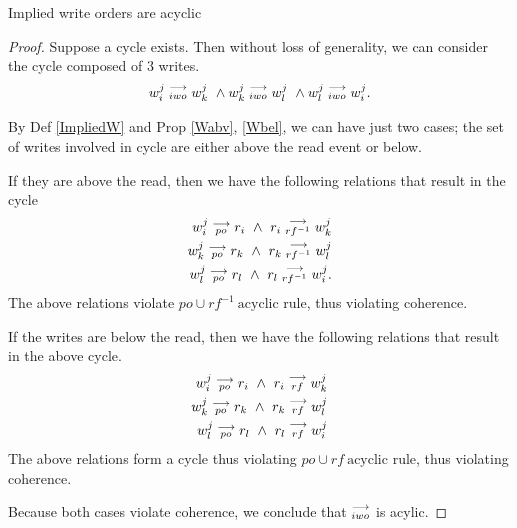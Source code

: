         
    \begin{property}
        \label{prop6}
        Implied write orders are acyclic
    \end{property}

    \begin{proof}
        Suppose a cycle exists. Then without loss of generality, we can consider the cycle composed of 3 writes.
        \begin{align*}
            \reln{w_i^j}{iwo}{w_k^j} \ \wedge \reln{w_k^j}{iwo}{w_l^j} \ \wedge \reln{w_l^j}{iwo}{w_i^j}.  
        \end{align*}
        
        By Def \ref{ImpliedW} and Prop \ref{Wabv}, \ref{Wbel}, we can have just two cases; the set of writes involved in cycle are either above the read event or below.

        If they are above the read, then we have the following relations that result in the cycle
        \begin{align*}
            w_i^j\stackrel{\longrightarrow}{_{po}}r_i \ \wedge \ r_i\stackrel{\longrightarrow}{_{rf^{-1}}}w_k^j \\
            w_k^j\stackrel{\longrightarrow}{_{po}}r_k \ \wedge \ r_k\stackrel{\longrightarrow}{_{rf^{-1}}}w_l^j \\
            w_l^j\stackrel{\longrightarrow}{_{po}}r_l \ \wedge \ r_l\stackrel{\longrightarrow}{_{rf^{-1}}}w_i^j. 
        \end{align*}
        The above relations violate $po \cup rf^{-1} \ \text{acyclic}$ rule, thus violating coherence.
        
        If the writes are below the read, then we have the following relations that result in the above cycle.
        \begin{align*}
            w_i^j\stackrel{\longrightarrow}{_{po}}r_i \ \wedge \ r_i\stackrel{\longrightarrow}{_{rf}}w_k^j \\
            w_k^j\stackrel{\longrightarrow}{_{po}}r_k \ \wedge \ r_k\stackrel{\longrightarrow}{_{rf}}w_l^j \\
            w_l^j\stackrel{\longrightarrow}{_{po}}r_l \ \wedge \ r_l\stackrel{\longrightarrow}{_{rf}}w_i^j 
        \end{align*}
        The above relations form a cycle thus violating $po \cup rf \ \text{acyclic}$ rule, thus violating coherence.

        Because both cases violate coherence, we conclude that $\stackrel{\longrightarrow}{_{iwo}}$ is acylic. 
    \end{proof}

